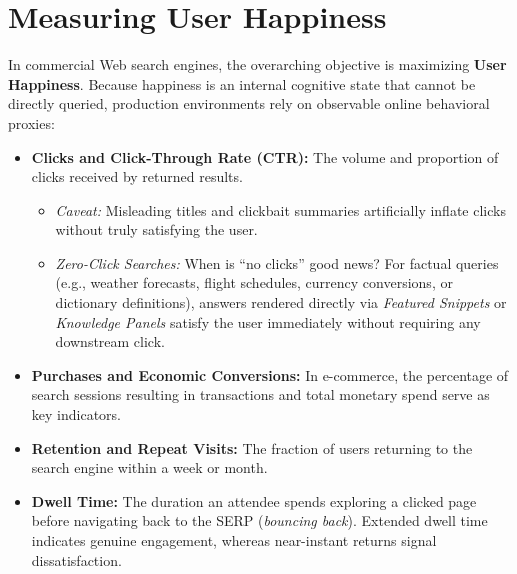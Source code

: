 \FloatBarrier
\section{Measuring User Happiness}

In commercial Web search engines, the overarching objective is maximizing \textbf{User Happiness}. Because happiness is an internal cognitive state that cannot be directly queried, production environments rely on observable online behavioral proxies:

\begin{itemize}
    \item \textbf{Clicks and Click-Through Rate (CTR):} The volume and proportion of clicks received by returned results.
    \begin{itemize}
        \item \textit{Caveat:} Misleading titles and clickbait summaries artificially inflate clicks without truly satisfying the user.
        \item \textit{Zero-Click Searches:} When is ``no clicks'' good news? For factual queries (e.g., weather forecasts, flight schedules, currency conversions, or dictionary definitions), answers rendered directly via \textit{Featured Snippets} or \textit{Knowledge Panels} satisfy the user immediately without requiring any downstream click.
    \end{itemize}
    \item \textbf{Purchases and Economic Conversions:} In e-commerce, the percentage of search sessions resulting in transactions and total monetary spend serve as key indicators.
    \item \textbf{Retention and Repeat Visits:} The fraction of users returning to the search engine within a week or month.
    \item \textbf{Dwell Time:} The duration an attendee spends exploring a clicked page before navigating back to the SERP (\textit{bouncing back}). Extended dwell time indicates genuine engagement, whereas near-instant returns signal dissatisfaction.
\end{itemize}


